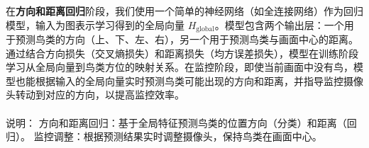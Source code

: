 
在\textbf{方向和距离回归}阶段，我们使用一个简单的神经网络（如全连接网络）作为回归模型，输入为图表示学习得到的全局向量 \( H_{\text{global}} \)。模型包含两个输出层：一个用于预测鸟类的方向（上、下、左、右），另一个用于预测鸟类与画面中心的距离。通过结合方向损失（交叉熵损失）和距离损失（均方误差损失），模型在训练阶段学习从全局向量到鸟类方位的映射关系。在监控阶段，即使当前画面中没有鸟，模型也能根据输入的全局向量实时预测鸟类可能出现的方向和距离，并指导监控摄像头转动到对应的方向，以提高监控效率。

\begin{figure}[h!]
\centering %
\end{figure}

\paragraph{}
说明：
方向和距离回归：基于全局特征预测鸟类的位置方向（分类）和距离（回归）。
监控调整：根据预测结果实时调整摄像头，保持鸟类在画面中心。